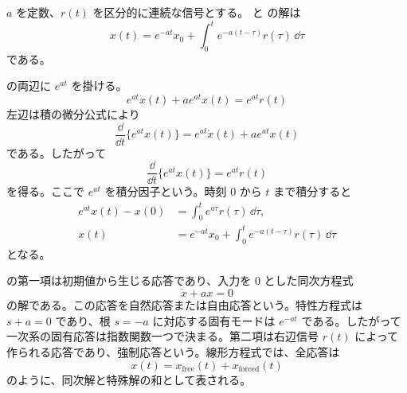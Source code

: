 \begin{theorem}[一次線形微分方程式の積分因子解]
$a$ を定数、$r(t)$ を区分的に連続な信号とする。 と  の解は
\begin{equation}
  x(t)=e^{-at}x_0+\int_0^t e^{-a(t-\tau)}r(\tau)\,\dd\tau
  \label{eq:first-order-integrating-factor-solution}
\end{equation}
である。
\end{theorem}

\begin{derivation}
 の両辺に $e^{at}$ を掛ける。
\begin{equation}
  e^{at}\dot{x}(t)+a e^{at}x(t)=e^{at}r(t)
\end{equation}
左辺は積の微分公式により
\begin{equation}
  \frac{\dd}{\dd t}\{e^{at}x(t)\}=e^{at}\dot{x}(t)+a e^{at}x(t)
\end{equation}
である。したがって
\begin{equation}
  \frac{\dd}{\dd t}\{e^{at}x(t)\}=e^{at}r(t)
\end{equation}
を得る。ここで $e^{at}$ を積分因子という。時刻 $0$ から $t$ まで積分すると
\begin{align}
  e^{at}x(t)-x(0)&=\int_0^t e^{a\tau}r(\tau)\,\dd\tau,\\
  x(t)&=e^{-at}x_0+\int_0^t e^{-a(t-\tau)}r(\tau)\,\dd\tau
\end{align}
となる。
\end{derivation}

 の第一項は初期値から生じる応答であり、入力を 0 とした同次方程式
\begin{equation}
  \dot{x}+a x=0
\end{equation}
の解である。この応答を自然応答または自由応答という。特性方程式は $s+a=0$ であり、根 $s=-a$ に対応する固有モードは $e^{-at}$ である。したがって一次系の固有応答は指数関数一つで決まる。第二項は右辺信号 $r(t)$ によって作られる応答であり、強制応答という。線形方程式では、全応答は
\begin{equation}
  x(t)=x_{\mathrm{free}}(t)+x_{\mathrm{forced}}(t)
\end{equation}
のように、同次解と特殊解の和として表される。

